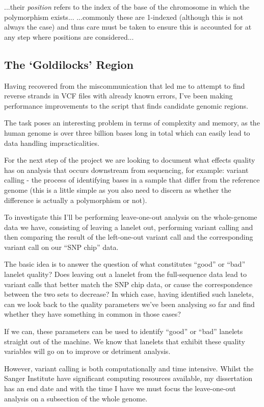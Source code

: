 ...their \textit{position} refers to the index of the base of the chromosome in
which the polymorphism exists...
...commonly these are 1-indexed (although this is not always the case) and thus
care must be taken to ensure this is accounted for at any step where positions
are considered...

\subsection{The `Goldilocks' Region}

Having recovered from the miscommunication that led me to attempt to find
reverse strands in VCF files with already known errors, I’ve been making
performance improvements to the script that finds candidate genomic regions.

The task poses an interesting problem in terms of complexity and memory, as the
human genome is over three billion bases long in total which can easily lead to
data handling impracticalities.

For the next step of the project we are looking to document what effects quality
has on analysis that occurs downstream from sequencing, for example: variant
calling - the process of identifying bases in a sample that differ from the
reference genome (this is a little simple as you also need to discern as
whether the difference is actually a polymorphism or not).

To investigate this I’ll be performing leave-one-out analysis on the
whole-genome data we have, consisting of leaving a lanelet out, performing
variant calling and then comparing the result of the left-one-out variant call
and the corresponding variant call on our “SNP chip” data.

The basic idea is to answer the question of what constitutes “good” or
“bad” lanelet quality? Does leaving out a lanelet from the full-sequence data
lead to variant calls that better match the SNP chip data, or cause the
correspondence between the two sets to decrease? In which case, having
identified such lanelets, can we look back to the quality parameters we’ve been
analysing so far and find whether they have something in common in those cases?

If we can, these parameters can be used to identify “good” or “bad” lanelets
straight out of the machine. We know that lanelets that exhibit these quality
variables will go on to improve or detriment analysis.

However, variant calling is both computationally and time intensive.  Whilst
the Sanger Institute have significant computing resources available, my
dissertation has an end date and with the time I have we must focus the
leave-one-out analysis on a subsection of the whole genome.


